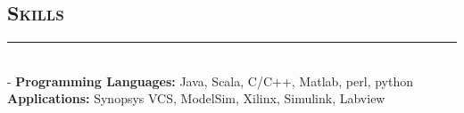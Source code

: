 \documentclass[12pt]{res}
\newcommand{\style}[1]{\color{Blue}\large\textsc{#1}}
\begin{document}
\begin{resume}
\section{\style{Skills}}
\rule{18cm}{0.5mm}\\
 -\sectionwidth \resumewidth
 \textbf{Programming Languages:}  Java, Scala, C/C++, Matlab, perl, python    \hfill \vspace{-0.5mm}\\
 \textbf{Applications:} Synopsys VCS,  ModelSim, Xilinx, Simulink, Labview\\%

   
   

   




\end{resume}
\end{document}
